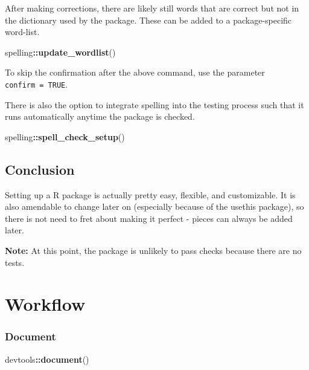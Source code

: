 \documentclass[]{book}
\newenvironment{Shaded}{\begin{snugshade}}{\end{snugshade}}
\newcommand{\KeywordTok}[1]{\textcolor[rgb]{0.13,0.29,0.53}{\textbf{#1}}}
\newcommand{\NormalTok}[1]{#1}
\newcommand{\OperatorTok}[1]{\textcolor[rgb]{0.81,0.36,0.00}{\textbf{#1}}}
\begin{document}
After making corrections, there are likely still words that are correct but not in the dictionary used by the package. These can be added to a package-specific word-list.

\begin{Shaded}
\begin{Highlighting}[]
\NormalTok{spelling}\OperatorTok{::}\KeywordTok{update_wordlist}\NormalTok{()}
\end{Highlighting}
\end{Shaded}

To skip the confirmation after the above command, use the parameter \texttt{confirm\ =\ TRUE}.

There is also the option to integrate spelling into the testing process such that it runs automatically anytime the package is checked.

\begin{Shaded}
\begin{Highlighting}[]
\NormalTok{spelling}\OperatorTok{::}\KeywordTok{spell_check_setup}\NormalTok{()}
\end{Highlighting}
\end{Shaded}

\hypertarget{conclusion}{%
\section{Conclusion}\label{conclusion}}

Setting up a R package is actually pretty easy, flexible, and customizable. It is also amendable to change later on (especially because of the usethis package), so there is not need to fret about making it perfect - pieces can always be added later.

\textbf{Note:} At this point, the package is unlikely to pass checks because there are no tests.

\hypertarget{workflow}{%
\chapter{Workflow}\label{workflow}}

\hypertarget{document}{%
\subsection{Document}\label{document}}

\begin{Shaded}
\begin{Highlighting}[]
\NormalTok{devtools}\OperatorTok{::}\KeywordTok{document}\NormalTok{()}
\end{Highlighting}
\end{Shaded}
\end{document}
